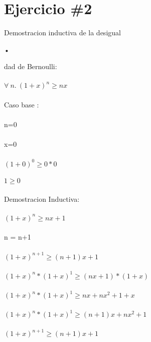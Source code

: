 \documentclass[10pt,a4paper]{article}
\begin{document}
\section*{Ejercicio \#2 } 
Demostracion  inductiva de la desigual\begin{center}
•
\end{center}dad de Bernoulli: \\ \\
        $\forall\ n.\ (1+x)^n\geq nx$ \\ \\
        Caso base : \\ \\
       n=0 \\ \\
       x=0  \\ \\
       $(1+0)^0\geq 0*0$ \\ \\
       $1 \geq 0 $ \\ \\
       
       Demostracion Inductiva: \\ \\
        $(1+x)^n\geq nx+1$ \\ \\
n = n+1\\ \\        
        $(1+x)^{n+1}\geq (n+1)x+1$ \\ \\
         $(1+x)^n*(1+x)^1 \geq (nx+1)*(1+x)$ \\ \\ 
$(1+x)^n*(1+x)^1 \geq nx+nx^2+1+x$ \\ \\
$(1+x)^n*(1+x)^1 \geq (n+1)x+nx^2+ 1$\\ \\
$(1+x)^{n+1} \geq (n+1)x+ 1$\\ \\
\end{document}
